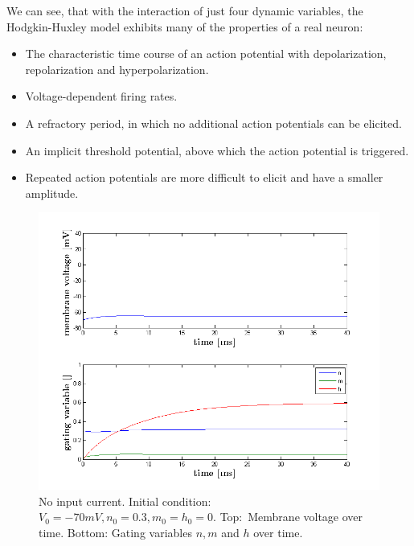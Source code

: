 \documentclass{scrartcl}
\begin{document}
We can see, that with the interaction of just four dynamic variables, the Hodgkin-Huxley model exhibits many of the properties of a real neuron:
\begin{itemize}
\item The characteristic time course of an action potential with depolarization, repolarization and hyperpolarization.
\item Voltage-dependent firing rates.
\item A refractory period, in which no additional action potentials can be elicited.
\item An implicit threshold potential, above which the action potential is triggered.
\item Repeated action potentials are more difficult to elicit and have a smaller amplitude.
\end{itemize}

\begin{figure}
\centering
\includegraphics[trim = {1.4cm 0.3 1.8cm 1cm}, height=0.35\textheight, clip]{../pics/zero}
\caption{No input current. Initial condition: $V_0 = -70\si{mV}, n_0 = 0.3, m_0 = h_0 = 0$. Top:~Membrane voltage over time. Bottom: Gating variables $n, m$ and $h$ over time.}
\label{zero}
\end{figure}
\end{document}

